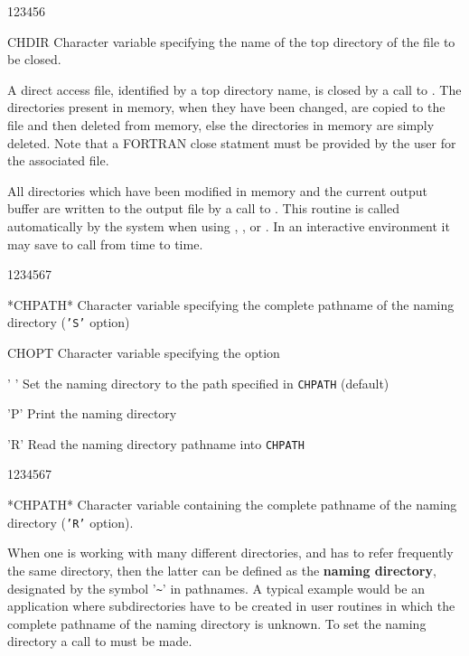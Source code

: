
\begin{DLtt}{123456}
\item[CHDIR]Character variable specifying the name of the top directory of the
file to be closed.
\end{DLtt}

A direct access file, identified by a top directory name,
is closed by a call to .
The directories present in memory,
when they have been changed,
are copied to the file and then deleted from memory, else
the directories in memory are simply deleted.
Note that a FORTRAN close statment must be provided by the
user for the associated file.


All directories which have been modified in memory
and the current output buffer are written to the output file by a call
to . This routine is called
automatically by the system when using , 
,  or .
In an interactive environment it may save to call  from
time to time.

\Idesc
\begin{DLtt}{1234567}
\item[*CHPATH*]Character variable specifying the complete pathname of the
naming directory ({\tt'S'} option)
\item[CHOPT]Character variable specifying the option
\begin{DLtt}{12}
\item[' ']Set the naming directory to the path specified in
{\tt CHPATH} (default)
\item['P']Print the naming directory
\item['R']Read the naming directory pathname into {\tt CHPATH}
\end{DLtt}
\end{DLtt}
\Odesc
\begin{DLtt}{1234567}
\item[*CHPATH*]Character variable containing the complete pathname of the
naming directory ({\tt'R'} option).
\end{DLtt}
\par 
When one is working with many different directories, and has to
refer frequently the same directory, then the latter can be defined
as the {\bf naming directory}, designated by the symbol
'\verb!~!'
in pathnames.
A typical example would be an application where subdirectories have
to be created in user routines in which the complete pathname of the
naming directory is unknown.
To set the naming directory a call to  must be made.
